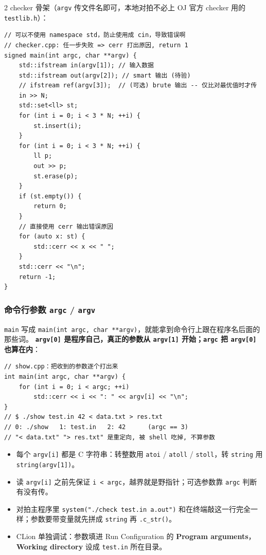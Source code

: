 \begin{multicols*}{2}
	checker 骨架（\texttt{argv} 传文件名即可，本地对拍不必上 OJ 官方 checker 用的 \texttt{testlib.h}）：

	\begin{verbatim}
// 可以不使用 namespace std，防止使用成 cin，导致错误啊
// checker.cpp: 任一步失败 => cerr 打出原因, return 1
signed main(int argc, char **argv) {
	std::ifstream in(argv[1]); // 输入数据
	std::ifstream out(argv[2]); // smart 输出 (待验)
	// ifstream ref(argv[3]);  // (可选) brute 输出 -- 仅比对最优值时才传
	in >> N;
	std::set<ll> st;
	for (int i = 0; i < 3 * N; ++i) {
		st.insert(i);
	}
	for (int i = 0; i < 3 * N; ++i) {
		ll p;
		out >> p;
		st.erase(p);
	}
	if (st.empty()) {
		return 0;
	}
	// 直接使用 cerr 输出错误原因
	for (auto x: st) {
		std::cerr << x << " ";
	}
	std::cerr << "\n";
	return -1;
}
	\end{verbatim}

	\subsubsection{命令行参数 \texttt{argc} / \texttt{argv}}

	\texttt{main} 写成 \texttt{main(int argc, char **argv)}，就能拿到命令行上跟在程序名后面的那些词。
	\textbf{\texttt{argv[0]} 是程序自己，真正的参数从 \texttt{argv[1]} 开始；\texttt{argc} 把 \texttt{argv[0]} 也算在内}：

	\begin{verbatim}
// show.cpp：把收到的参数逐个打出来
int main(int argc, char **argv) {
	for (int i = 0; i < argc; ++i)
		std::cerr << i << ": " << argv[i] << "\n";
}
// $ ./show test.in 42 < data.txt > res.txt
// 0: ./show   1: test.in   2: 42      (argc == 3)
// "< data.txt" "> res.txt" 是重定向, 被 shell 吃掉, 不算参数
	\end{verbatim}

	\begin{itemize}
		\item 每个 \texttt{argv[i]} 都是 C 字符串：转整数用 \texttt{atoi} / \texttt{atoll} / \texttt{stoll}，转 \texttt{string} 用 \texttt{string(argv[1])}。
		\item 读 \texttt{argv[i]} 之前先保证 \texttt{i < argc}，越界就是野指针；可选参数靠 \texttt{argc} 判断有没有传。
		\item 对拍主程序里 \texttt{system("./check test.in a.out")} 和在终端敲这一行完全一样；参数要带变量就先拼成 \texttt{string} 再 \texttt{.c\_str()}。
		\item CLion 单独调试：参数填进 Run Configuration 的 \textbf{Program arguments}，\textbf{Working directory} 设成 \texttt{test.in} 所在目录。
	\end{itemize}


\end{multicols*}
